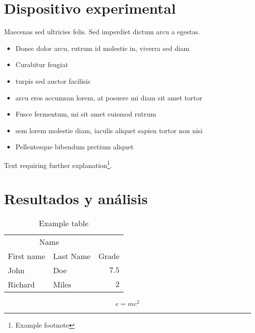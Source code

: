 \documentclass[twoside,twocolumn,a4paper]{article}
\begin{document}

\section{Dispositivo experimental}

Maecenas sed ultricies felis. Sed imperdiet dictum arcu a egestas. 
\begin{itemize}
\item Donec dolor arcu, rutrum id molestie in, viverra sed diam
\item Curabitur feugiat
\item turpis sed auctor facilisis
\item arcu eros accumsan lorem, at posuere mi diam sit amet tortor
\item Fusce fermentum, mi sit amet euismod rutrum
\item sem lorem molestie diam, iaculis aliquet sapien tortor non nisi
\item Pellentesque bibendum pretium aliquet
\end{itemize}
\blindtext %

Text requiring further explanation\footnote{Example footnote}.


\section{Resultados y an\'alisis}

\begin{table}
\caption{Example table}
\centering
\begin{tabular}{llr}
\toprule
\multicolumn{2}{c}{Name} \\
\cmidrule(r){1-2}
First name & Last Name & Grade \\
\midrule
John & Doe & $7.5$ \\
Richard & Miles & $2$ \\
\bottomrule
\end{tabular}
\end{table}

\blindtext %

\begin{equation}
\label{eq:emc}
e = mc^2
\end{equation}

\blindtext %

\end{document}
